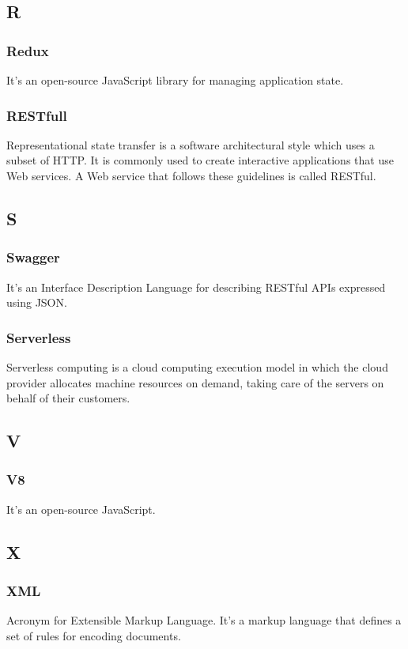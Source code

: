 \subsection*{R}
\subsubsection*{Redux}
It's an open-source JavaScript library for managing application state.

\subsubsection*{RESTfull}
Representational state transfer is a software architectural style which uses a subset of HTTP. 
It is commonly used to create interactive applications that use Web services. 
A Web service that follows these guidelines is called RESTful.

\subsection*{S}
\subsubsection*{Swagger}
It's an Interface Description Language for describing RESTful APIs expressed using JSON.

\subsubsection*{Serverless}
Serverless computing is a cloud computing execution model in which the cloud provider allocates 
machine resources on demand, taking care of the servers on behalf of their customers.

\subsection*{V}
\subsubsection*{V8}
It's an open-source JavaScript.

\subsection*{X}
\subsubsection*{XML}
Acronym for Extensible Markup Language. It's a markup language that defines a set of rules for encoding documents.
